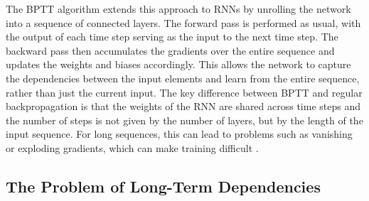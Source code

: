 \documentclass{article}
\begin{document}
The BPTT algorithm extends this approach to RNNs by unrolling the network into a sequence
of connected layers. The forward pass is performed as usual, with the output of each time
step serving as the input to the next time step. The backward pass then accumulates the
gradients over the entire sequence and updates the weights and biases accordingly. This
allows the network to capture the dependencies between the input elements and learn from
the entire sequence, rather than just the current input. The key difference between BPTT
and regular backpropagation is that the weights of the RNN are shared across time steps
and the number of steps is not given by the number of layers, but by the length of the
input sequence. For long sequences, this can lead to problems such as vanishing or
exploding gradients, which can make training difficult \cite{Bengio1994}.


\subsection{The Problem of Long-Term Dependencies}
\label{sec:2.3}
\end{document}
